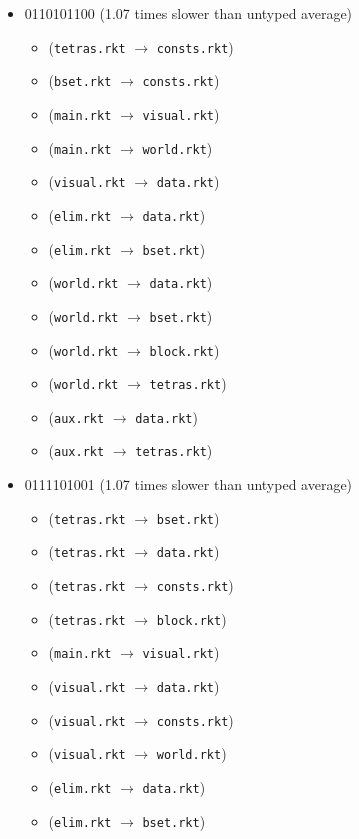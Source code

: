 \documentclass{article}
\newcommand{\mono}[1]{\texttt{#1}}
\begin{document}
\begin{itemize}
\item 0110101100 (1.07 times slower than untyped average)
  \begin{itemize}
  \item (\mono{tetras.rkt} $\rightarrow$ \mono{consts.rkt})
  \item (\mono{bset.rkt} $\rightarrow$ \mono{consts.rkt})
  \item (\mono{main.rkt} $\rightarrow$ \mono{visual.rkt})
  \item (\mono{main.rkt} $\rightarrow$ \mono{world.rkt})
  \item (\mono{visual.rkt} $\rightarrow$ \mono{data.rkt})
  \item (\mono{elim.rkt} $\rightarrow$ \mono{data.rkt})
  \item (\mono{elim.rkt} $\rightarrow$ \mono{bset.rkt})
  \item (\mono{world.rkt} $\rightarrow$ \mono{data.rkt})
  \item (\mono{world.rkt} $\rightarrow$ \mono{bset.rkt})
  \item (\mono{world.rkt} $\rightarrow$ \mono{block.rkt})
  \item (\mono{world.rkt} $\rightarrow$ \mono{tetras.rkt})
  \item (\mono{aux.rkt} $\rightarrow$ \mono{data.rkt})
  \item (\mono{aux.rkt} $\rightarrow$ \mono{tetras.rkt})
  \end{itemize}
\item 0111101001 (1.07 times slower than untyped average)
  \begin{itemize}
  \item (\mono{tetras.rkt} $\rightarrow$ \mono{bset.rkt})
  \item (\mono{tetras.rkt} $\rightarrow$ \mono{data.rkt})
  \item (\mono{tetras.rkt} $\rightarrow$ \mono{consts.rkt})
  \item (\mono{tetras.rkt} $\rightarrow$ \mono{block.rkt})
  \item (\mono{main.rkt} $\rightarrow$ \mono{visual.rkt})
  \item (\mono{visual.rkt} $\rightarrow$ \mono{data.rkt})
  \item (\mono{visual.rkt} $\rightarrow$ \mono{consts.rkt})
  \item (\mono{visual.rkt} $\rightarrow$ \mono{world.rkt})
  \item (\mono{elim.rkt} $\rightarrow$ \mono{data.rkt})
  \item (\mono{elim.rkt} $\rightarrow$ \mono{bset.rkt})

\end{itemize}
\end{itemize}
\end{document}
